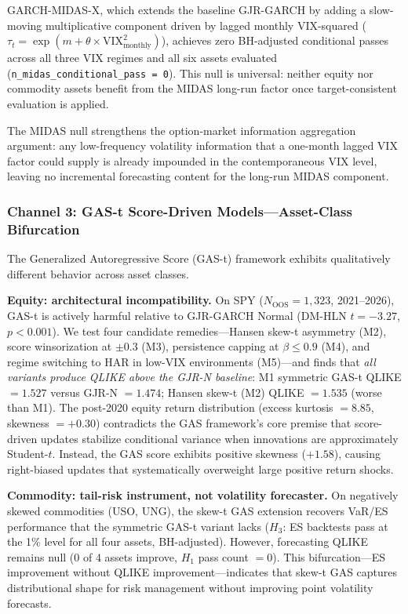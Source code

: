 \documentclass[12pt,a4paper]{article}
\begin{document}
GARCH-MIDAS-X, which extends the baseline GJR-GARCH by adding a slow-moving multiplicative component driven by lagged monthly VIX-squared ($\tau_t = \exp(m + \theta \times \text{VIX}^2_{\text{monthly}})$), achieves zero BH-adjusted conditional passes across all three VIX regimes and all six assets evaluated (\texttt{n\_midas\_conditional\_pass = 0}). This null is universal: neither equity nor commodity assets benefit from the MIDAS long-run factor once target-consistent evaluation is applied.

The MIDAS null strengthens the option-market information aggregation argument: any low-frequency volatility information that a one-month lagged VIX factor could supply is already impounded in the contemporaneous VIX level, leaving no incremental forecasting content for the long-run MIDAS component.

\subsubsection{Channel 3: GAS-t Score-Driven Models---Asset-Class Bifurcation}

The Generalized Autoregressive Score (GAS-t) framework \citep{crealetal2013} exhibits qualitatively different behavior across asset classes.

\textbf{Equity: architectural incompatibility.} On SPY ($N_{\text{OOS}} = 1{,}323$, 2021--2026), GAS-t is actively harmful relative to GJR-GARCH Normal (DM-HLN $t = -3.27$, $p < 0.001$). We test four candidate remedies---Hansen skew-t asymmetry (M2), score winsorization at $\pm0.3$ (M3), persistence capping at $\beta \leq 0.9$ (M4), and regime switching to HAR in low-VIX environments (M5)---and finds that \emph{all variants produce QLIKE above the GJR-N baseline}: M1 symmetric GAS-t QLIKE $= 1.527$ versus GJR-N $= 1.474$; Hansen skew-t (M2) QLIKE $= 1.535$ (worse than M1). The post-2020 equity return distribution (excess kurtosis $= 8.85$, skewness $= +0.30$) contradicts the GAS framework's core premise that score-driven updates stabilize conditional variance when innovations are approximately Student-$t$. Instead, the GAS score exhibits positive skewness ($+1.58$), causing right-biased updates that systematically overweight large positive return shocks.

\textbf{Commodity: tail-risk instrument, not volatility forecaster.} On negatively skewed commodities (USO, UNG), the skew-t GAS extension \citep{hansen1994} recovers VaR/ES performance that the symmetric GAS-t variant lacks ($H_3$: ES backtests pass at the 1\% level for all four assets, BH-adjusted). However, forecasting QLIKE remains null (0 of 4 assets improve, $H_1$ pass count $= 0$). This bifurcation---ES improvement without QLIKE improvement---indicates that skew-t GAS captures distributional shape for risk management without improving point volatility forecasts.
\end{document}

